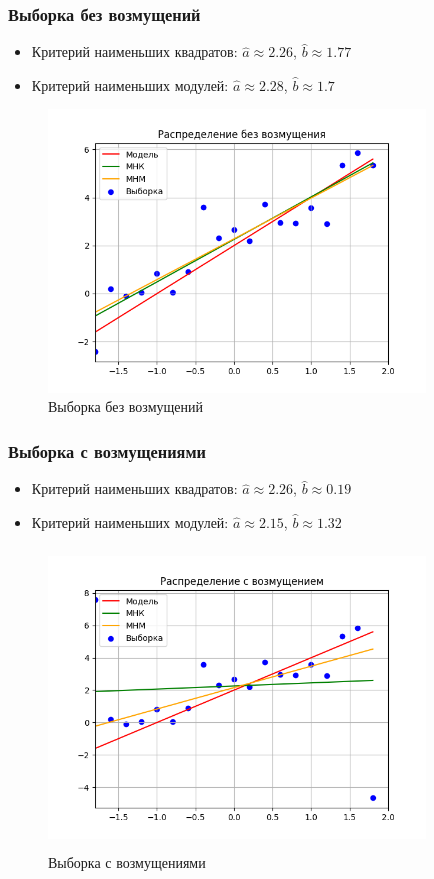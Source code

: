 \documentclass[../main.tex]{subfiles}
\begin{document}
    \subsubsection{Выборка без возмущений}
		\begin{itemize}
			\item{Критерий наименьших квадратов:}
			$\hat{a}\approx 2.26$, $\hat{b}\approx 1.77$
			\item{Критерий наименьших модулей:}
			$\hat{a}\approx 2.28$, $\hat{b}\approx 1.7$
		\end{itemize}
		\begin{figure}[H]
			\centering
			\includegraphics[width = 10cm, height 8cm]{figures/noDisturbance.png}
			\caption{Выборка без возмущений}
			\label{w/o_pert}
		\end{figure}
	
	\subsubsection{Выборка с возмущениями}
		\begin{itemize}
			\item{Критерий наименьших квадратов:}
			$\hat{a}\approx 2.26$, $\hat{b}\approx 0.19$
			\item{Критерий наименьших модулей:}
			$\hat{a}\approx 2.15$, $\hat{b}\approx 1.32$
		\end{itemize}
		\begin{figure}[H]
			\centering
			\includegraphics[width = 10cm, height = 8cm]{figures/Disturbance.png}
			\caption{Выборка с возмущениями}
			\label{w_pert}
		\end{figure}
		
\end{document}
